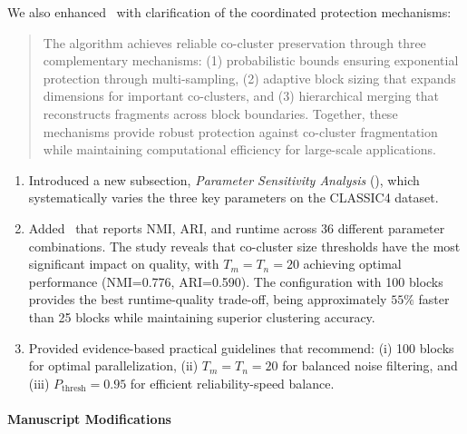\documentclass{ar2rc}
\theoremstyle{definition}
\theoremstyle{remark} %
\begin{document}
We also enhanced~ with clarification of the coordinated protection mechanisms:

\begin{quote}
  The algorithm achieves reliable co-cluster preservation through three complementary mechanisms: (1) probabilistic bounds ensuring exponential protection through multi-sampling, (2) adaptive block sizing that expands dimensions for important co-clusters, and (3) hierarchical merging that reconstructs fragments across block boundaries. Together, these mechanisms provide robust protection against co-cluster fragmentation while maintaining computational efficiency for large-scale applications.
\end{quote}


\begin{enumerate}
  \item Introduced a new subsection, \emph{Parameter Sensitivity Analysis} (), which systematically varies the three key parameters on the CLASSIC4 dataset.
  \item Added~ that reports NMI, ARI, and runtime across 36 different parameter combinations. The study reveals that co-cluster size thresholds have the most significant impact on quality, with $T_m=T_n=20$ achieving optimal performance (NMI=0.776, ARI=0.590). The configuration with 100 blocks provides the best runtime-quality trade-off, being approximately $55\%$ faster than 25 blocks while maintaining superior clustering accuracy.
  \item Provided evidence-based practical guidelines that recommend: (i) 100 blocks for optimal parallelization, (ii) $T_m=T_n=20$ for balanced noise filtering, and (iii) $P_{\text{thresh}}=0.95$ for efficient reliability-speed balance.
\end{enumerate}

\paragraph{Manuscript Modifications}
\end{document}
